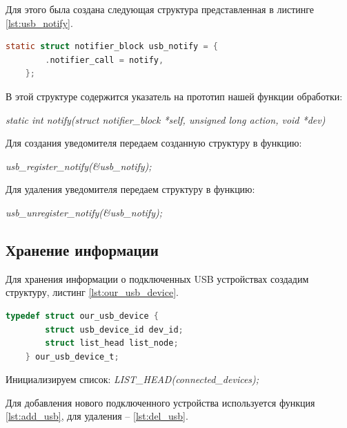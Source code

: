 \documentclass[a4paper, 10pt]{article}
\begin{document}
	Для этого была создана следующая структура представленная в листинге \ref{lst:usb_notify}.
	
	\begin{lstlisting}[language=C, caption = Структура usb\_notify, label=lst:usb_notify]
	static struct notifier_block usb_notify = {
		.notifier_call = notify,
	};
	\end{lstlisting}
	
	В этой структуре содержится указатель на прототип нашей функции обработки:
	
	\hspace*{5mm}\textit{static int notify(struct notifier\_block *self, unsigned long action, void *dev)}
	
	Для создания уведомителя передаем созданную структуру в функцию:
	
	\hspace*{5mm}\textit{usb\_register\_notify(\&usb\_notify);}
	
	Для удаления уведомителя передаем структуру в функцию:
	
	\hspace*{5mm}\textit{usb\_unregister\_notify(\&usb\_notify);}
	\subsection{Хранение информации}
	\hspace*{5mm} Для хранения информации о подключенных USB устройствах создадим структуру, листинг \ref{lst:our_usb_device}.
	
	\begin{lstlisting}[language=C, caption = Структура our\_usb\_device, label =  lst:our_usb_device]
	typedef struct our_usb_device {
		struct usb_device_id dev_id;
		struct list_head list_node;
	} our_usb_device_t;
	\end{lstlisting}
	
	Инициализируем список: \textit{LIST\_HEAD(connected\_devices);}
	
	Для добавления нового подключенного устройства используется функция \ref{lst:add_usb},  для удаления -- \ref{lst:del_usb}.
\end{document}
